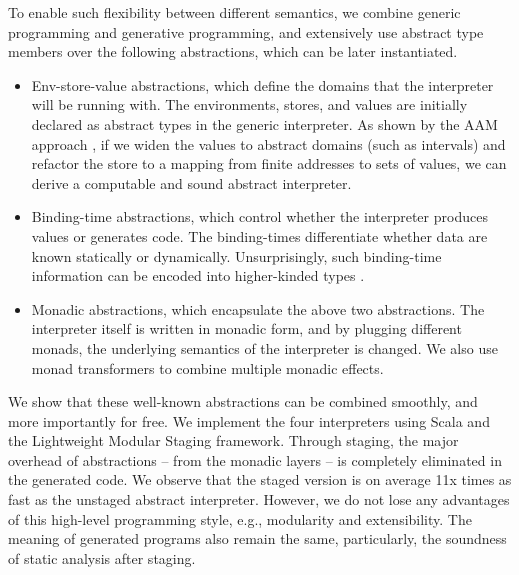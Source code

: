To enable such flexibility between different semantics, we combine generic
programming and generative programming, and extensively use abstract type
members over the following abstractions, which can be later instantiated.

\begin{itemize}
\item Env-store-value abstractions, which define the domains that the interpreter will be running with.
  The environments, stores, and values are initially declared as abstract types in the generic interpreter.
  As shown by the AAM approach \cite{DBLP:journals/jfp/HornM12,
  DBLP:conf/icfp/HornM10}, if we widen the values to abstract domains (such as
  intervals) and refactor the store to a mapping from finite addresses to sets of
  values, we can derive a computable and sound abstract interpreter.
\item Binding-time abstractions, which control whether the interpreter produces
  values or generates code. The binding-times differentiate whether data are 
  known statically or dynamically. Unsurprisingly, such binding-time
  information can be encoded into higher-kinded types 
    \cite{DBLP:journals/jfp/CaretteKS09, Ofenbeck:2017:SGP:3136040.3136060}.
\item Monadic abstractions, which encapsulate the above two abstractions.
  The interpreter itself is written in monadic form, and by plugging different monads, 
  the underlying semantics of the interpreter is changed. We also use monad transformers to combine multiple monadic effects.
\end{itemize}


We show that these well-known abstractions can be combined smoothly, and more
importantly for free. We implement the four interpreters using Scala and the
Lightweight Modular Staging \cite{DBLP:conf/gpce/RompfO10} framework. Through
staging, the major overhead of abstractions -- from the monadic layers -- is
completely eliminated in the generated code. We observe that the staged version is 
on average 11x times as fast as the unstaged abstract interpreter. 
However, we do not lose any advantages of this high-level programming style,
e.g., modularity and extensibility. The meaning of generated programs also remain
the same, particularly, the soundness of static analysis after staging.

